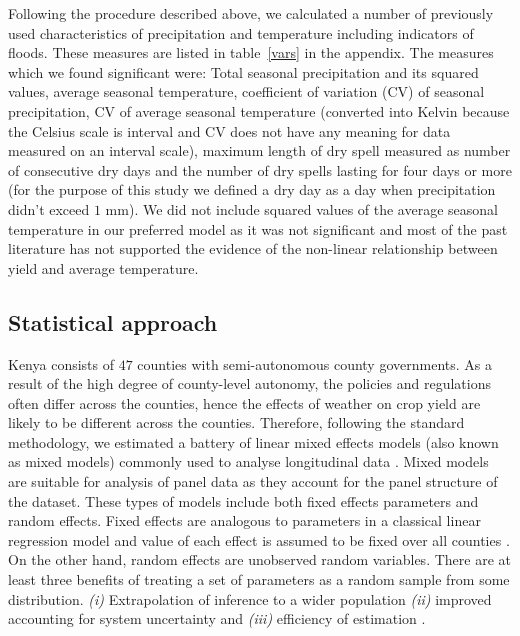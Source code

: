 \documentclass[12pt]{iopart}
\begin{document}
Following the procedure described above, we calculated a number of previously used characteristics of precipitation and temperature including indicators of floods. These measures are listed in table~\ref{vars} in the appendix. The measures which we found significant were: Total seasonal precipitation and its squared values, average seasonal temperature, coefficient of variation (CV) of seasonal precipitation, CV of average seasonal temperature (converted into Kelvin because the Celsius scale is interval and CV does not have any meaning for data measured on an interval scale),  maximum length of dry spell measured as number of consecutive dry days and the number of dry spells lasting for four days or more (for the purpose of this study we defined a dry day as a day when precipitation didn't exceed $1$ mm). We did not include squared values of the average seasonal temperature in our preferred model as it was not significant and most of the past literature has not supported the evidence of the non-linear relationship between yield and average temperature.
\subsection{Statistical approach}\label{stats}


\sloppy
Kenya consists of $47$ counties with semi-autonomous county governments. As a result of the high degree of county-level autonomy, the policies and regulations often differ across the counties, hence the effects of weather on crop yield are likely to be different across the counties. Therefore, following the standard methodology, we estimated a battery of linear mixed effects models (also known as mixed models) commonly used to analyse longitudinal data \cite{bates2000mixed}. Mixed models are suitable for analysis of panel data as they account for the panel structure of the dataset. These types of models include both fixed effects parameters and random effects. Fixed effects are analogous to parameters in a classical linear regression model and value of each effect is assumed to be fixed over all counties \cite{bates2010lme4}. On the other hand, random effects are unobserved random variables. There are at least three benefits of treating a set of parameters as a random sample from some distribution. \textit{(i)} Extrapolation of inference to a wider population \textit{(ii)} improved accounting for system uncertainty and \textit{(iii)} efficiency of estimation \cite{KERYch9,KERYch12}.
\end{document}
